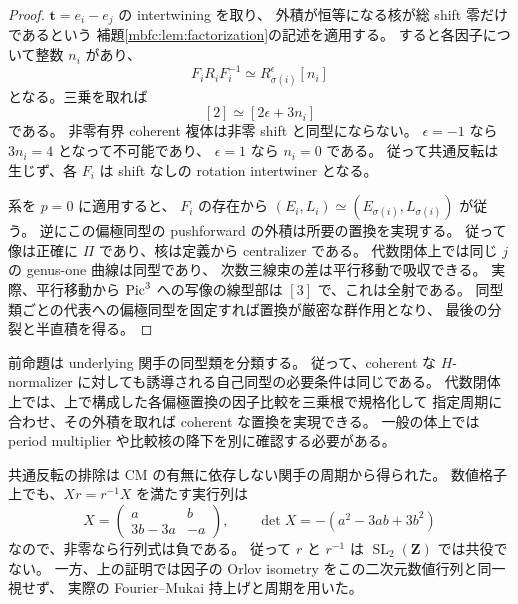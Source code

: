 \begin{proof}
$\mathbf t=e_i-e_j$ の intertwining を取り、
外積が恒等になる核が総 shift 零だけであるという
補題\ref{mbfc:lem:factorization}の記述を適用する。
すると各因子について整数 $n_i$ があり、
\[
 F_iR_iF_i^{-1}\simeq R_{\sigma(i)}^{\epsilon}[n_i]
\]
となる。三乗を取れば
\[
 [2]\simeq[2\epsilon+3n_i]
\]
である。
非零有界 coherent 複体は非零 shift と同型にならない。
$\epsilon=-1$ なら $3n_i=4$ となって不可能であり、
$\epsilon=1$ なら $n_i=0$ である。
従って共通反転は生じず、各 $F_i$ は shift なしの rotation intertwiner となる。

系を $p=0$ に適用すると、
$F_i$ の存在から $(E_i,L_i)\simeq(E_{\sigma(i)},L_{\sigma(i)})$ が従う。
逆にこの偏極同型の pushforward の外積は所要の置換を実現する。
従って像は正確に $\Pi$ であり、核は定義から centralizer である。
代数閉体上では同じ $j$ の genus-one 曲線は同型であり、
次数三線束の差は平行移動で吸収できる。
実際、平行移動から $\operatorname{Pic}^3$ への写像の線型部は $[3]$ で、これは全射である。
同型類ごとの代表への偏極同型を固定すれば置換が厳密な群作用となり、
最後の分裂と半直積を得る。
\end{proof}

\begin{remark}
\label{mbfc:rem:normalizer-coherence}
前命題は underlying 関手の同型類を分類する。
従って、coherent な $H$-normalizer に対しても誘導される自己同型の必要条件は同じである。
代数閉体上では、上で構成した各偏極置換の因子比較を三乗根で規格化して
指定周期に合わせ、その外積を取れば coherent な置換を実現できる。
一般の体上では period multiplier や比較核の降下を別に確認する必要がある。

共通反転の排除は CM の有無に依存しない関手の周期から得られた。
数値格子上でも、$Xr=r^{-1}X$ を満たす実行列は
\[
 X=\begin{pmatrix}a&b\\3b-3a&-a\end{pmatrix},\qquad
 \det X=-(a^2-3ab+3b^2)
\]
なので、非零なら行列式は負である。
従って $r$ と $r^{-1}$ は $\operatorname{SL}_2(\mathbf Z)$ では共役でない。
一方、上の証明では因子の Orlov isometry をこの二次元数値行列と同一視せず、
実際の Fourier--Mukai 持上げと周期を用いた。
\end{remark}


